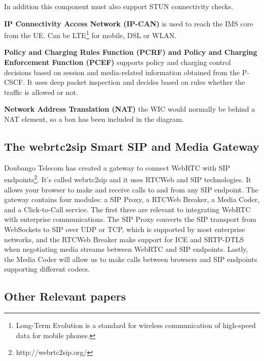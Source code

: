 In addition this component must also support STUN connectivity checks.

\textbf{IP Connectivity Access Network (IP-CAN)}
is used to reach the IMS core from the UE. Can be LTE\footnote{Long-Term Evolution is a standard for wireless communication of high-speed data for mobile phones.} for mobile, DSL or WLAN.

\textbf{Policy and Charging Rules Function (PCRF) and Policy and Charging Enforcement Function (PCEF)}
supports policy and charging control decisions based on session and media-related information obtained from the P-CSCF. It uses deep packet inspection and decides based on rules whether the traffic is allowed or not.

\textbf{Network Address Translation (NAT)}
the WIC would normally be behind a NAT element, so a box has been included in the diagram.

\subsection{The webrtc2sip Smart SIP and Media Gateway}
Doubango Telecom has created a gateway to connect WebRTC with SIP endpoints\footnote{http://webrtc2sip.org/}. It's called webrtc2sip and it uses RTCWeb and SIP technologies. It allows your browser to make and receive calls to and from any SIP endpoint. The gateway contains four modules: a SIP Proxy, a RTCWeb Breaker, a Media Coder, and a Click-to-Call service. The first three are relevant to integrating WebRTC with enterprise communications. The SIP Proxy converts the SIP transport from WebSockets to SIP over UDP or TCP, which is supported by most enterprise networks, and the RTCWeb Breaker make support for ICE and SRTP-DTLS when negotiating media streams between WebRTC and SIP endpoints. Lastly, the Media Coder will allow us to make calls between browsers and SIP endpoints supporting different codecs.


\subsection{Other Relevant papers}

